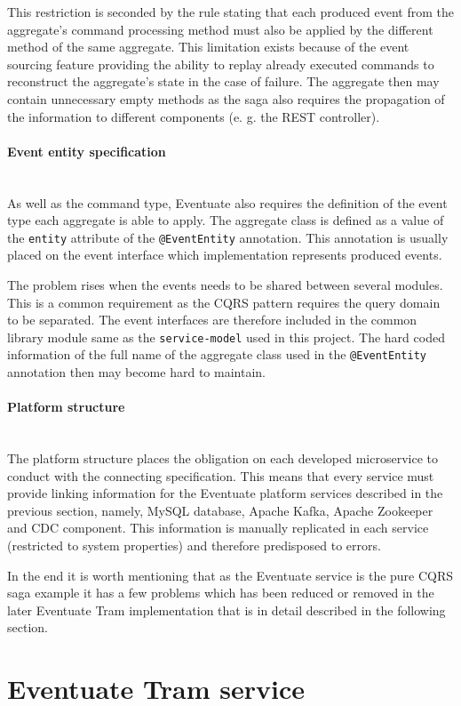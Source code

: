 \documentclass[oneside,
  digital, %
  table,   %
  lof,     %
  lot,     %
]{fithesis3}
\newcommand{\newlinepar}[1]{\paragraph{#1}\needspace{4\baselineskip}\mbox{}\\}
\begin{document}
This restriction is seconded by the rule stating that each produced event from the aggregate's command processing method must also be applied by the different method of the same aggregate. This limitation exists because of the event sourcing feature providing the ability to replay already executed commands to reconstruct the aggregate's state in the case of failure. The aggregate then may contain unnecessary empty methods as the saga also requires the propagation of the information to different components (e. g. the REST controller).


\newlinepar{Event entity specification}

As well as the command type, Eventuate also requires the definition of the event type each aggregate is able to apply. The aggregate class is defined as a value of the \texttt{entity} attribute of the \texttt{@EventEntity} annotation. This annotation is usually placed on the event interface which implementation represents produced events.

The problem rises when the events needs to be shared between several modules. This is a common requirement as the CQRS pattern requires the query domain to be separated. The event interfaces are therefore included in the common library module same as the \texttt{service-model} used in this project. The hard coded information of the full name of the aggregate class used in the \texttt{@EventEntity} annotation then may become hard to maintain.

\newlinepar{Platform structure}

The platform structure places the obligation on each developed microservice to conduct with the connecting specification. This means that every service must provide linking information for the Eventuate platform services described in the previous section, namely, MySQL database, Apache Kafka, Apache Zookeeper and CDC component. This information is manually replicated in each service (restricted to system properties) and therefore predisposed to errors.

\hfill \break

In the end it is worth mentioning that as the Eventuate service is the pure CQRS saga example it has a few problems which has been reduced or removed in the later Eventuate Tram implementation that is in detail described in the following section. 


\section{Eventuate Tram service}
\end{document}
